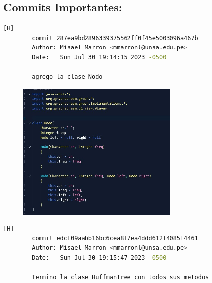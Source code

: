 \documentclass{article}
\begin{document}
	\subsection{Commits Importantes:}
	\begin{lstlisting}[language=bash,caption={Mi primer commit importante es cuando agregue la clase Nodo para ser posteriormente usada por huffmantree .}][H]
		commit 287ea9bd2896339375562ff0f45e5003096a467b
		Author: Misael Marron <mmarronl@unsa.edu.pe>
		Date:   Sun Jul 30 19:14:15 2023 -0500

    	agrego la clase Nodo
	\end{lstlisting}
	
	\begin{figure}[H]
		\centering
		\includegraphics[width=0.7\textwidth,keepaspectratio]{img/codigo1.jpg}
	\end{figure}
	
	\clearpage
		
	 \begin{lstlisting}[language=bash,caption={Mi segundo commit mas importante es cuando agregue la clase HuffmanTree por completo , con todos sus metodos y funcionalidades .}][H]
		commit edcf09aabb16bc6cea8f7ea4ddd612f4085f4461
		Author: Misael Marron <mmarronl@unsa.edu.pe>
		Date:   Sun Jul 30 19:15:47 2023 -0500

    	Termino la clase HuffmanTree con todos sus metodos
	\end{lstlisting}
	
\end{document}
